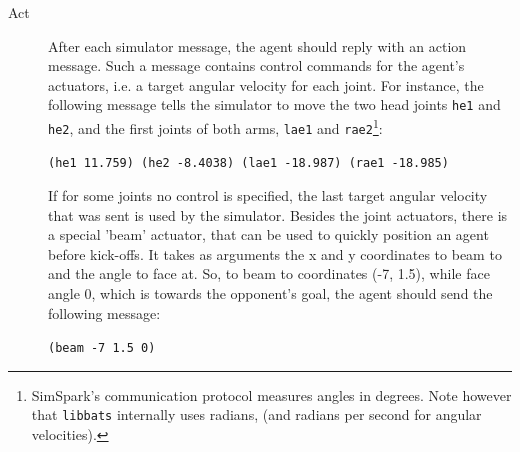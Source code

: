\begin{description}
      \item[Act] After each simulator message, the agent should reply
        with an action message. Such a message contains control
        commands for the agent's actuators, i.e. a target angular
        velocity for each joint. For instance, the following message
        tells the simulator to move the two head joints {\tt he1} and
        {\tt he2}, and the first joints of both arms, {\tt lae1} and
        {\tt rae2}\footnote{SimSpark's communication protocol measures
          angles in degrees. Note however that {\tt libbats}
          internally uses radians, (and radians per second for angular
          velocities).}:
	
	{\tt (he1 11.759) (he2 -8.4038) (lae1 -18.987) (rae1 -18.985)}
	
	If for some joints no control is specified, the last target
        angular velocity that was sent is used by the
        simulator. Besides the joint actuators, there is a special
        'beam' actuator, that can be used to quickly position an agent
        before kick-offs. It takes as arguments the x and y
        coordinates to beam to and the angle to face at. So, to beam
        to coordinates (-7, 1.5), while face angle 0, which is towards
        the opponent's goal, the agent should send the following
        message:
	
	{\tt (beam -7 1.5 0)}
	
\end{description}


